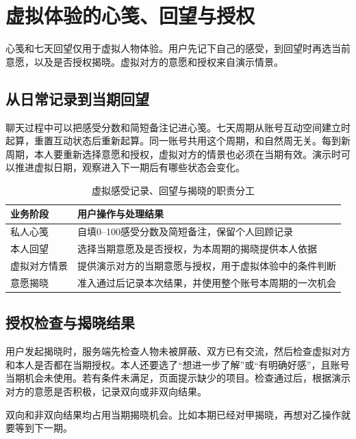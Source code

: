 \clearpage
\section{虚拟体验的心笺、回望与授权}
\label{sec:design-cycle}
心笺和七天回望仅用于虚拟人物体验。用户先记下自己的感受，到回望时再选当前意愿，以及是否授权揭晓。虚拟对方的意愿和授权来自演示情景。

\subsection{从日常记录到当期回望}
聊天过程中可以把感受分数和简短备注记进心笺。七天周期从账号互动空间建立时起算，重置互动状态后重新起算。同一账号共用这个周期，和自然周无关。每到新周期，本人要重新选择意愿和授权，虚拟对方的情景也必须在当期有效。演示时可以推进虚拟日期，观察进入下一期后有哪些状态会变化。

\begin{table}[H]
\centering\small
\caption{虚拟感受记录、回望与揭晓的职责分工}\label{tab:design-cycle-states}
\begin{tabularx}{\linewidth}{@{}p{30mm}X@{}}
\toprule 业务阶段 & 用户操作与处理结果 \\ \midrule
私人心笺 & 自填0--100感受分数及简短备注，保留个人回顾记录 \\
本人回望 & 选择当期意愿及是否授权，为本周期的揭晓提供本人依据 \\
虚拟对方情景 & 提供演示对方的当期意愿与授权，用于虚拟体验中的条件判断 \\
意愿揭晓 & 准入通过后记录本次结果，并使用整个账号本周期的一次机会 \\
\bottomrule
\end{tabularx}
\end{table}

\subsection{授权检查与揭晓结果}
用户发起揭晓时，服务端先检查人物未被屏蔽、双方已有交流，然后检查虚拟对方和本人是否都在当期授权。本人还要选了“想进一步了解”或“有明确好感”，且账号当期机会未使用。若有条件未满足，页面提示缺少的项目。检查通过后，根据演示对方的意愿是否积极，记录双向或非双向结果。

双向和非双向结果均占用当期揭晓机会。比如本期已经对甲揭晓，再想对乙操作就要等到下一期。


